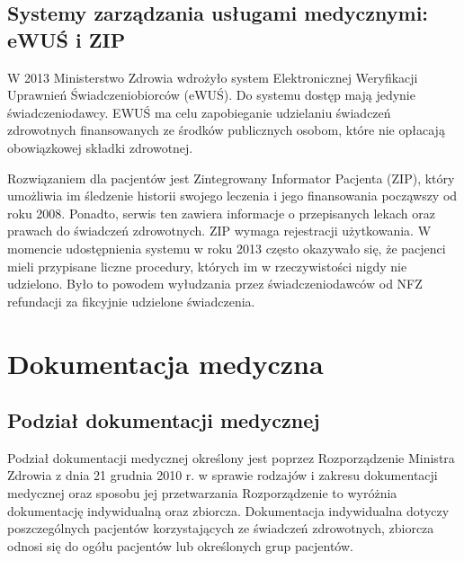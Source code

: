 \subsection{Systemy zarządzania usługami medycznymi: eWUŚ i ZIP}
W 2013 Ministerstwo Zdrowia wdrożyło system Elektronicznej Weryfikacji Uprawnień Świadczeniobiorców (eWUŚ). Do systemu dostęp mają jedynie świadczeniodawcy. EWUŚ ma celu zapobieganie udzielaniu świadczeń zdrowotnych finansowanych ze środków publicznych osobom, które nie opłacają obowiązkowej składki zdrowotnej. 

Rozwiązaniem dla pacjentów jest Zintegrowany Informator Pacjenta (ZIP), który umożliwia im śledzenie historii swojego leczenia i jego finansowania począwszy od roku 2008. Ponadto, serwis ten zawiera informacje o przepisanych lekach oraz prawach do świadczeń zdrowotnych. ZIP wymaga rejestracji użytkowania. W momencie udostępnienia systemu w roku 2013 często okazywało się, że pacjenci mieli przypisane liczne procedury, których im w rzeczywistości nigdy nie udzielono. Było to powodem wyłudzania przez świadczeniodawców od NFZ refundacji za fikcyjnie udzielone świadczenia.

  

\section[Tytuł w paginie][Tytuł w spisie treści]{Dokumentacja medyczna}
\subsection{Podział dokumentacji medycznej}
Podział dokumentacji medycznej określony jest poprzez Rozporządzenie Ministra Zdrowia z dnia 21 grudnia 2010 r. w sprawie rodzajów i zakresu dokumentacji medycznej oraz sposobu jej przetwarzania \cite{mz:rzdm:online}
Rozporządzenie to wyróżnia dokumentację indywidualną oraz zbiorcza. Dokumentacja indywidualna dotyczy poszczególnych pacjentów korzystających ze świadczeń zdrowotnych, zbiorcza odnosi się do ogółu pacjentów lub określonych grup pacjentów.  

